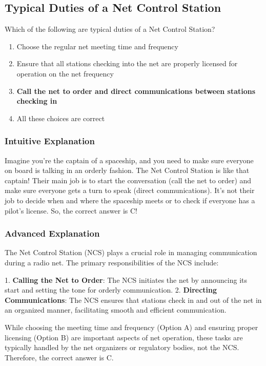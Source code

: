 \subsection{Typical Duties of a Net Control Station}\label{T2C02}

\begin{tcolorbox}[colback=gray!10!white,colframe=black!75!black,title=T2C02]
Which of the following are typical duties of a Net Control Station?
\begin{enumerate}[label=\Alph*]
    \item Choose the regular net meeting time and frequency
    \item Ensure that all stations checking into the net are properly licensed for operation on the net frequency
    \item \textbf{Call the net to order and direct communications between stations checking in}
    \item All these choices are correct
\end{enumerate}
\end{tcolorbox}

\subsubsection{Intuitive Explanation}
Imagine you're the captain of a spaceship, and you need to make sure everyone on board is talking in an orderly fashion. The Net Control Station is like that captain! Their main job is to start the conversation (call the net to order) and make sure everyone gets a turn to speak (direct communications). It's not their job to decide when and where the spaceship meets or to check if everyone has a pilot's license. So, the correct answer is C!

\subsubsection{Advanced Explanation}
The Net Control Station (NCS) plays a crucial role in managing communication during a radio net. The primary responsibilities of the NCS include:

1. \textbf{Calling the Net to Order}: The NCS initiates the net by announcing its start and setting the tone for orderly communication.
2. \textbf{Directing Communications}: The NCS ensures that stations check in and out of the net in an organized manner, facilitating smooth and efficient communication.

While choosing the meeting time and frequency (Option A) and ensuring proper licensing (Option B) are important aspects of net operation, these tasks are typically handled by the net organizers or regulatory bodies, not the NCS. Therefore, the correct answer is C.

